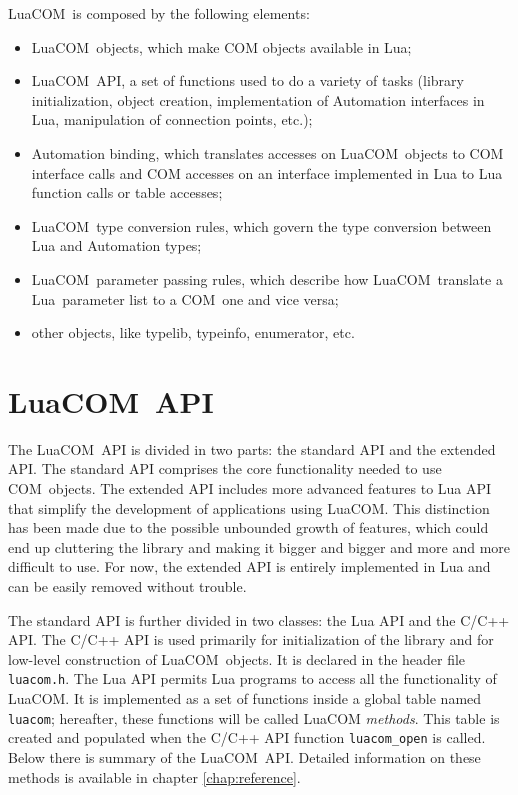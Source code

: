 \documentclass[11pt,a4paper,english]{report}
\newcommand{\ident}[1]{\mbox{\texttt{#1}}}
\newcommand{\techname}[1]{\mbox{#1}}
\newcommand{\lua}{\techname{Lua}}
\newcommand{\com}{\techname{COM}}
\newcommand{\luacom}{\techname{LuaCOM}}
\begin{document}
  \luacom\ is composed by the following elements:

  \begin{itemize}

    \item \luacom\ objects, which make COM objects available in Lua;

    \item \luacom\ API, a set of functions used to do a variety of
    tasks (library initialization, object creation, implementation of
    Automation interfaces in Lua, manipulation of connection points,
    etc.);

    \item Automation binding, which translates accesses on \luacom\
    objects to COM interface calls and COM accesses on an interface
    implemented in Lua to Lua function calls or table accesses;

    \item \luacom\ type conversion rules, which govern the type conversion
    between Lua and Automation types;

    \item \luacom\ parameter passing rules, which describe how \luacom\
    translate a \lua\ parameter list to a \com\ one and vice versa;

    \item other objects, like typelib, typeinfo, enumerator, etc.

  \end{itemize}


\section{\luacom\ API}

  The \luacom\ API is divided in two parts: the standard API and the
  extended API. The standard API comprises the core functionality
  needed to use \com\ objects. The extended API includes more advanced
  features to Lua API that simplify the development of applications
  using \luacom. This distinction has been made due to the possible
  unbounded growth of features, which could end up cluttering the
  library and making it bigger and bigger and more and more difficult
  to use. For now, the extended API is entirely implemented in Lua
  and can be easily removed without trouble.

  The standard API is further divided in two classes: the Lua API and
  the C/C++ API. The C/C++ API is used primarily for initialization of
  the library and for low-level construction of \luacom\ objects. It
  is declared in the header file \ident{luacom.h}. The Lua API
  permits Lua programs to access all the functionality of \luacom. It
  is implemented as a set of functions inside a global table named
  \verb+luacom+; hereafter, these functions will be called LuaCOM
  \emph{methods}. This table is created and populated when the C/C++ API function
  \ident{luacom\_open} is called. Below there is summary of
  the \luacom\ API. Detailed information on these methods is available
  in chapter \ref{chap:reference}.
\end{document}
